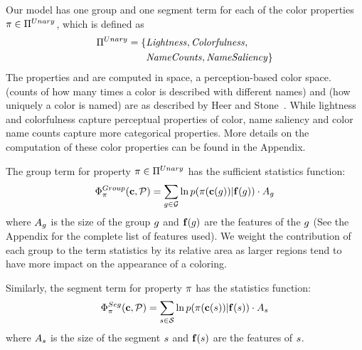 Our model has one group and one segment term for each of the color properties $ \pi \in \Pi^{Unary}$, which is defined as
\begin{align*}
\Pi^{Unary} = \{ &\text{\emph{Lightness}}, \text{\emph{Colorfulness}}, \\
                 &\text{\emph{NameCounts}}, \text{\emph{NameSaliency}} \}
\end{align*}
The properties  and  are computed in \lab space, a perception-based color space.  (counts of how many times a color is described with different names) and  (how uniquely a color is named) are as described by Heer and Stone~. While lightness and colorfulness capture perceptual properties of color, name saliency and color name counts capture more categorical properties. More details on the computation of these color properties can be found in the Appendix.

The group term for property $\pi \in \Pi^{Unary}$ has the sufficient statistics function:
\begin{equation*}
 \Phi^{Group}_\pi(\mathbf{c}, \mathcal{P}) = \sum_{g \in \mathcal{G}} \ln p( \pi( \mathbf{c}(g) ) | \mathbf{f}(g)) \cdot A_g
\end{equation*}
where $A_g$ is the size of the group $g$ and $\mathbf{f}(g)$ are the features of the $g$ (See the Appendix for the complete list of features used). We weight the contribution of each group to the term statistics by its relative area as larger regions tend to have more impact on the appearance of a coloring.

Similarly, the segment term for property $\pi$ has the statistics function:
 \begin{equation*}
 \Phi^{Seg}_\pi(\mathbf{c}, \mathcal{P}) = \sum_{s \in \mathcal{S}} \ln p( \pi( \mathbf{c}(s) ) | \mathbf{f}(s)) \cdot A_s
 \end{equation*}
where $A_s$ is the size of the segment $s$ and $\mathbf{f}(s)$ are the features of $s$.


